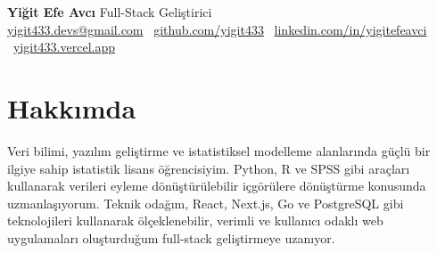\documentclass[10pt,a4paper]{extarticle}
\begin{document}
\begin{center}
    \begin{minipage}{\textwidth}
        \centering
        {\LARGE\textbf{Yiğit Efe Avcı}} \hspace{2pt} {\LARGE{Full-Stack Geliştirici}}\\[10pt]
        \href{mailto:yigit433.devs@gmail.com}{yigit433.devs@gmail.com} \textbullet\
        \href{https://github.com/yigit433}{github.com/yigit433} \textbullet\
        \href{https://linkedin.com/in/yigitefeavci}{linkedin.com/in/yigitefeavci} \textbullet\
        \href{https://yigit433.vercel.app}{yigit433.vercel.app}
    \end{minipage}
\end{center}
\section{Hakkımda}
Veri bilimi, yazılım geliştirme ve istatistiksel modelleme alanlarında güçlü bir ilgiye sahip istatistik lisans öğrencisiyim. Python, R ve SPSS gibi araçları kullanarak verileri eyleme dönüştürülebilir içgörülere dönüştürme konusunda uzmanlaşıyorum. Teknik odağım, React, Next.js, Go ve PostgreSQL gibi teknolojileri kullanarak ölçeklenebilir, verimli ve kullanıcı odaklı web uygulamaları oluşturduğum full-stack geliştirmeye uzanıyor.
\end{document}
